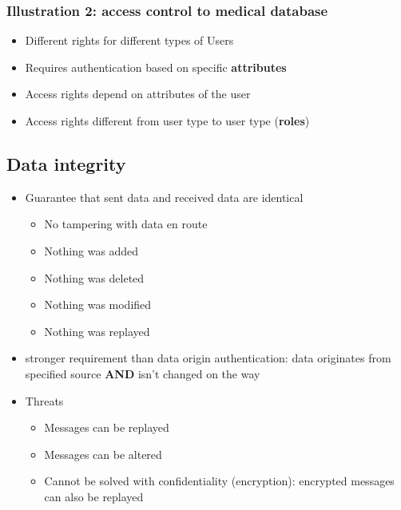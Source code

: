 \documentclass[11pt,british,faculty=ea,layout=titlefont,underline=false,titleUppercase=true,titleUnderline=true,hidelinks]{ugent2016-report}
\begin{document}
            \subsubsection{Illustration 2: access control to medical database} \label{subsub:access-control-to-medical-database}
                \begin{itemize}
                    \item Different rights for different types of Users
                    \item Requires authentication based on specific \textbf{attributes}
                    \item Access rights depend on attributes of the user
                    \item Access rights different from user type to user type (\textbf{roles})
                \end{itemize}


        \subsection{Data integrity} \label{sub:data-integrity}
            \begin{itemize}
                \item Guarantee that sent data and received data are identical
                    \begin{itemize}
                        \item No tampering with data en route
                        \item Nothing was added
                        \item Nothing was deleted
                        \item Nothing was modified
                        \item Nothing was replayed
                    \end{itemize}
                \item stronger requirement than data origin authentication: data originates from specified source \textbf{AND} isn't changed on the way
                \item Threats
                    \begin{itemize}
                        \item Messages can be replayed
                        \item Messages can be altered
                        \item Cannot be solved with confidentiality (encryption): encrypted messages can also be replayed
                    \end{itemize}
            \end{itemize}
\end{document}
